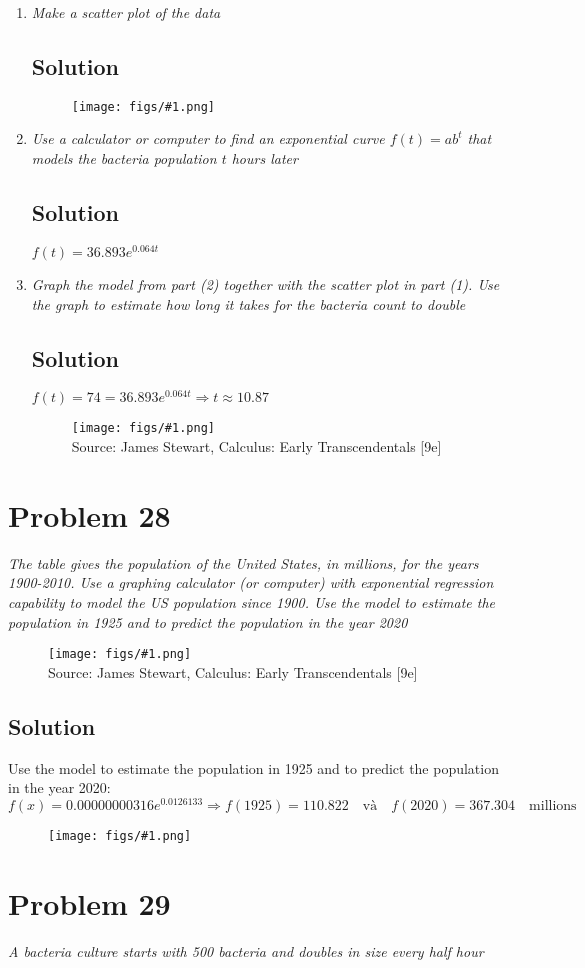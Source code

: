 \documentclass[11pt]{article}
\newcommand{\soln}{\subsection*}
\newcommand{\qn}{\textit}
\newcommand{\imagesource}[1]{{\footnotesize Source: #1}}
\newcommand{\imgqn}[1]{
	\begin{figure}[H]
		\centering
		\texttt{[image: figs/\#1.png]}\\
		\imagesource{James Stewart, Calculus: Early Transcendentals [9e]}
	\end{figure}
}
\newcommand{\imgsoln}[1]{
	\begin{figure}[H]
		\centering
		\texttt{[image: figs/\#1.png]}
	\end{figure}
}
\newcommand{\eqtext}[1]{\quad\text{#1}\quad}
\begin{document}
\begin{enumerate}
	\item \qn{Make a scatter plot of the data}
	\soln{Solution}
	\imgsoln{1.4.27-ans.a}
	
	\item \qn{Use a calculator or computer to find an exponential curve $f(t)=ab^t$ that models the bacteria population $t$ hours later}
	\soln{Solution}
	$f(t)=36.893e^{0.064t}$
	
	\item \qn{Graph the model from part (2) together with the scatter plot in part (1). Use the graph to estimate how long it takes for the bacteria count to double}
	\soln{Solution}
	$f(t)=74=36.893e^{0.064t} \Rightarrow t \approx 10.87$
	\imgqn{1.4.27.c}
\end{enumerate}

\section*{Problem 28}

\qn{The table gives the population of the United States, in millions, for the years 1900-2010. Use a graphing calculator (or computer) with exponential regression capability to model the US population since 1900. Use the model to estimate the population in 1925 and to predict the population in the year 2020}
\imgqn{1.4.28}

\soln{Solution}
Use the model to estimate the population in 1925 and to predict the population in the year 2020: $$f(x)=0.00000000316e^{0.0126133} \Rightarrow f(1925)=110.822 \eqtext{và} f(2020)=367.304 \eqtext{millions}$$
\imgsoln{1.4.28-ans}


\section*{Problem 29}

\qn{A bacteria culture starts with 500 bacteria and doubles in size every half hour}
\end{document}
